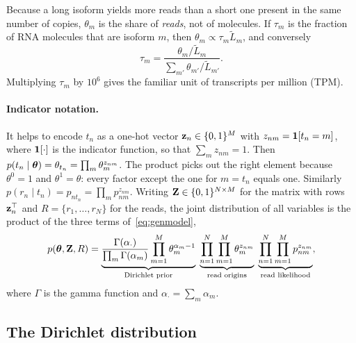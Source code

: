 Because a long isoform yields more reads than a short one present in the same number of copies, $\theta_m$ is the share of \emph{reads}, not of molecules. If $\tau_m$ is the fraction of RNA molecules that are isoform $m$, then $\theta_m\propto\tau_m\tilde L_m$, and conversely
\begin{equation}
  \tau_m = \frac{\theta_m/\tilde L_m}{\sum_{m'}\theta_{m'}/\tilde L_{m'}} .
\end{equation}
Multiplying $\tau_m$ by $10^6$ gives the familiar unit of transcripts per million (TPM).

\paragraph{Indicator notation.} It helps to encode $t_n$ as a one-hot vector $\mathbf{z}_n\in\{0,1\}^M$ with $z_{nm}=\mathbf{1}[t_n=m]$, where $\mathbf{1}[\cdot]$ is the indicator function, so that $\sum_m z_{nm}=1$. Then $p(t_n\mid\boldsymbol{\theta})=\theta_{t_n}=\prod_m\theta_m^{z_{nm}}$. The product picks out the right element because $\theta^0=1$ and $\theta^1=\theta$: every factor except the one for $m=t_n$ equals one. Similarly $p(r_n\mid t_n)=p_{nt_n}=\prod_m p_{nm}^{z_{nm}}$. Writing $\mathbf{Z}\in\{0,1\}^{N\times M}$ for the matrix with rows $\mathbf{z}_n^\top$ and $R=\{r_1,\dots,r_N\}$ for the reads, the joint distribution of all variables is the product of the three terms of~\eqref{eq:genmodel},
\begin{equation}
  p(\boldsymbol{\theta},\mathbf{Z},R) = \underbrace{\frac{\Gamma(\alpha_\cdot)}{\prod_m\Gamma(\alpha_m)}\prod_{m=1}^M\theta_m^{\alpha_m-1}}_{\text{Dirichlet prior}}\;
  \underbrace{\prod_{n=1}^N\prod_{m=1}^M\theta_m^{z_{nm}}}_{\text{read origins}}\;
  \underbrace{\prod_{n=1}^N\prod_{m=1}^M p_{nm}^{z_{nm}}}_{\text{read likelihood}},
  \label{eq:joint}
\end{equation}
where $\Gamma$ is the gamma function and $\alpha_\cdot=\sum_m\alpha_m$.

\subsection{The Dirichlet distribution}
\label{sec:dirichlet}

